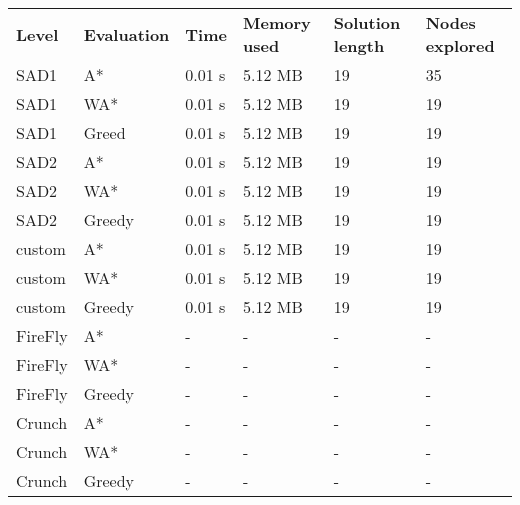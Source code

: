 \documentclass[Main]{subfiles}
\begin{document}
\textbf{}




\begin{table}[h]
\begin{tabular}{llllll}
\rowcolor[HTML]{EFEFEF} 
\textbf{Level} & \textbf{Evaluation} & \textbf{Time} & \textbf{Memory used} & \textbf{Solution length} & \textbf{Nodes explored} \\
SAD1           & A*                  & 0.01 s        & 5.12 MB              & 19                       & 35                      \\
SAD1           & WA*                 & 0.01 s        & 5.12 MB              & 19                       & 19                      \\
SAD1           & Greed               & 0.01 s        & 5.12 MB              & 19                       & 19                      \\
SAD2           & A*                  & 0.01 s        & 5.12 MB              & 19                       & 19                      \\
SAD2           & WA*                 & 0.01 s        & 5.12 MB              & 19                       & 19                      \\
SAD2           & Greedy              & 0.01 s        & 5.12 MB              & 19                       & 19                      \\
custom         & A*                  & 0.01 s        & 5.12 MB              & 19                       & 19                      \\
custom         & WA*                 & 0.01 s        & 5.12 MB              & 19                       & 19                      \\
custom         & Greedy              & 0.01 s        & 5.12 MB              & 19                       & 19                      \\
FireFly        & A*                  & -           & -                  & -                      & -                     \\
FireFly        & WA*                 & -           & -                  & -                      & -                     \\
FireFly        & Greedy              & -           & -                  & -                      & -                     \\
Crunch         & A*                  & -           & -                  & -                      & -                     \\
Crunch         & WA*                 & -           & -                  & -                      & -                     \\
Crunch         & Greedy              & -           & -                  & -                      & -                     
\end{tabular}
\end{table}
\end{document}
